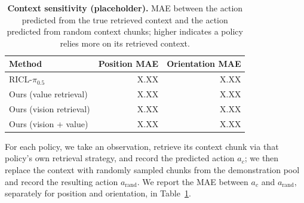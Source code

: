 \begin{table}[t]
    \centering
    \caption{\textbf{Context sensitivity (placeholder).} MAE between the
    action predicted from the true retrieved context and the action
    predicted from random context chunks; higher indicates a policy relies
    more on its retrieved context.}
    \label{tab:context-sensitivity}
    \footnotesize
    \begin{tabular}{lrr}
        \toprule
        Method & Position MAE & Orientation MAE \\
        \midrule
        RICL-$\pi_{0.5}$        & X.XX & X.XX \\
        Ours (value retrieval)  & X.XX & X.XX \\
        Ours (vision retrieval) & X.XX & X.XX \\
        Ours (vision + value)   & X.XX & X.XX \\
        \bottomrule
    \end{tabular}
\end{table}

For each policy, we take an observation, retrieve its context chunk via that
policy's own retrieval strategy, and record the predicted action $a_c$; we
then replace the context with randomly sampled chunks from the demonstration
pool and record the resulting action $a_{\text{rand}}$. We report the MAE
between $a_c$ and $a_{\text{rand}}$, separately for position and
orientation, in Table~\ref{tab:context-sensitivity}.

\gap{[Analysis]}

